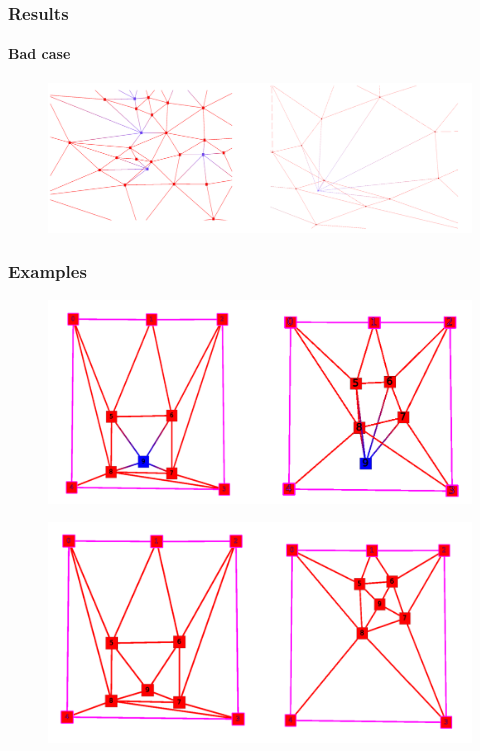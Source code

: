 \begin{frame}
\frametitle{Results}
\framesubtitle{Bad case}
\begin{exampleblock}{}
\begin{figure}[!h]
\centering
\includegraphics[scale=0.4]{../rapport/img/bad_case.png}
\end{figure}
\end{exampleblock}{}
\end{frame}

\begin{frame}
\frametitle{Examples}
\begin{exampleblock}{}
\begin{figure}[!h]
\centering
\includegraphics[scale=0.4]{../rapport/img/bad_exemple.png}
\end{figure}
\end{exampleblock}{}
\pause
\begin{exampleblock}{}
\begin{figure}[!h]
\centering
\includegraphics[scale=0.4]{../rapport/img/bad_good.png}
\end{figure}
\end{exampleblock}{}
\end{frame}
